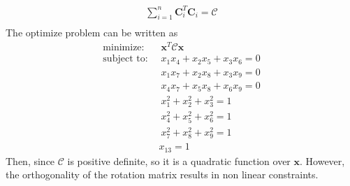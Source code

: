\begin{align}
\sum_{i=1}^{n}\mathbf{C}_i^T\mathbf{C}_i = \mathcal{C}\\
\end{align}
The optimize problem can be written as
\begin{align}
\text{minimize: }& \ \mathbf{x}^T\mathcal{C}\mathbf{x}\\
\text{subject to: }& \ x_1x_4+x_2x_5+x_3x_6 = 0 \\
& \ x_1x_7+x_2x_8+x_3x_9 = 0 \\
& \ x_4x_7+x_5x_8+x_6x_9 = 0 \\
& \ x_1^2+x_2^2+x_3^2 = 1 \\
& \ x_4^2+x_5^2+x_6^2 = 1 \\
& \ x_7^2+x_8^2+x_9^2 = 1 \\
& x_{13} = 1
\end{align}
Then, since 
$\mathcal{C}$ is positive definite, so it is a quadratic function over $\mathbf{x}$. However, the orthogonality of the rotation matrix results in non linear constraints. 

